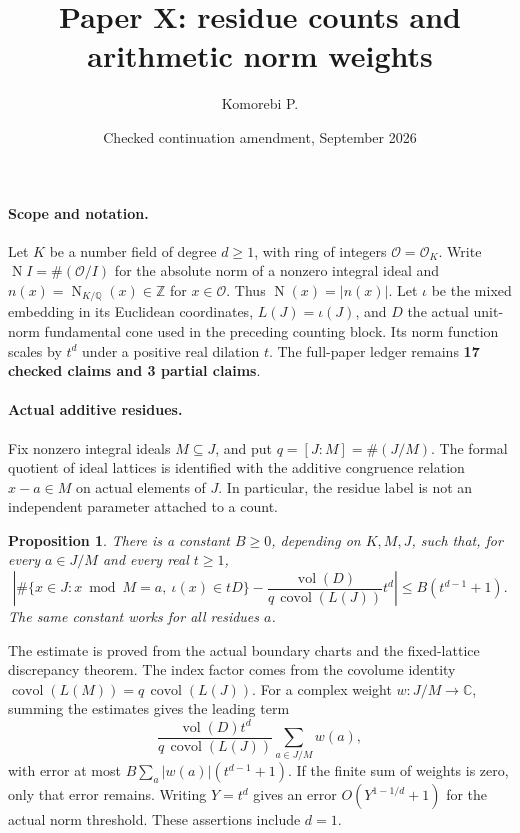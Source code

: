 \documentclass[11pt]{article}
\title{Paper X: residue counts and arithmetic norm weights}
\author{Komorebi P.}
\date{Checked continuation amendment, September 2026}
\newcommand{\OO}{\mathcal O}
\newcommand{\ZZ}{\mathbb Z}
\newcommand{\CC}{\mathbb C}
\newcommand{\Nm}{\operatorname N}
\newcommand{\vol}{\operatorname{vol}}
\newcommand{\covol}{\operatorname{covol}}
\newcommand{\absn}[1]{\lvert #1\rvert}
\newtheorem{proposition}{Proposition}
\begin{document}
\maketitle
\vspace{-1.5em}

\paragraph{Scope and notation.}
Let $K$ be a number field of degree $d\geq1$, with ring of integers
$\OO=\OO_K$. Write $\Nm I=\#(\OO/I)$ for the absolute norm of a nonzero
integral ideal and $n(x)=\Nm_{K/\mathbb Q}(x)\in\ZZ$ for $x\in\OO$.
Thus $\Nm(x)=\absn{n(x)}$. Let $\iota$ be the mixed embedding in its
Euclidean coordinates, $L(J)=\iota(J)$, and $D$ the actual unit-norm
fundamental cone used in the preceding counting block. Its norm function
scales by $t^d$ under a positive real dilation $t$.
The full-paper ledger remains \textbf{17 checked claims and 3 partial claims}.

\paragraph{Actual additive residues.}
Fix nonzero integral ideals $M\subseteq J$, and put $q=[J:M]=\#(J/M)$.
The formal quotient of ideal lattices is identified with the additive
congruence relation $x-a\in M$ on actual elements of $J$. In particular,
the residue label is not an independent parameter attached to a count.

\begin{proposition}\label{prop:residue-count}
There is a constant $B\geq0$, depending on $K,M,J$, such that, for every
$a\in J/M$ and every real $t\geq1$,
\[
 \left|\#\{x\in J:x\bmod M=a,\ \iota(x)\in tD\}
 -\frac{\vol(D)}{q\,\covol(L(J))}t^d\right|
 \leq B(t^{d-1}+1).
\]
The same constant works for all residues $a$.
\end{proposition}

The estimate is proved from the actual boundary charts and the fixed-lattice
discrepancy theorem. The index factor comes from the covolume identity
$\covol(L(M))=q\,\covol(L(J))$.
For a complex weight $w:J/M\to\CC$, summing the estimates gives the leading
term
\[
 \frac{\vol(D)t^d}{q\,\covol(L(J))}\sum_{a\in J/M}w(a),
\]
with error at most $B\sum_a\absn{w(a)}(t^{d-1}+1)$.
If the finite sum of weights is zero, only that error remains.
Writing $Y=t^d$ gives an error $O(Y^{1-1/d}+1)$ for the actual norm threshold.
These assertions include $d=1$.
\end{document}
